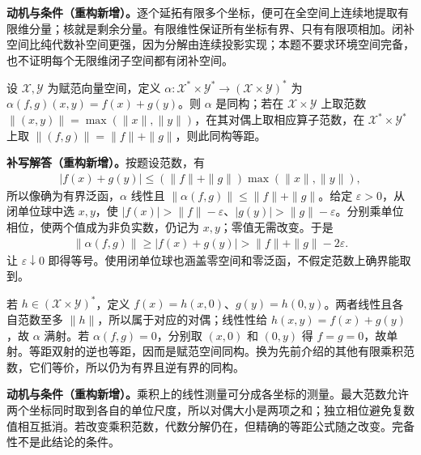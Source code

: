 \documentclass[../../main.tex]{subfiles}
\begin{document}
\begin{remark}
\textbf{动机与条件（重构新增）。}逐个延拓有限多个坐标，便可在全空间上连续地提取有限维分量；核就是剩余分量。有限维性保证所有坐标有界、只有有限项相加。闭补空间比纯代数补空间更强，因为分解由连续投影实现；本题不要求环境空间完备，也不证明每个无限维闭子空间都有闭补空间。
\end{remark}
\begin{exercise}\label{exercise:ch05-dual-product}
设 $\mathcal X,\mathcal Y$ 为赋范向量空间，定义 $\alpha:\mathcal X^*\times\mathcal Y^*\to(\mathcal X\times\mathcal Y)^*$ 为 $\alpha(f,g)(x,y)=f(x)+g(y)$。则 $\alpha$ 是同构；若在 $\mathcal X\times\mathcal Y$ 上取范数 $\|(x,y)\|=\max(\|x\|,\|y\|)$，在其对偶上取相应算子范数，在 $\mathcal X^*\times\mathcal Y^*$ 上取 $\|(f,g)\|=\|f\|+\|g\|$，则此同构等距。
\end{exercise}
\begin{solution}
\textbf{补写解答（重构新增）。}按题设范数，有
\begin{align*}
|f(x)+g(y)|\le(\|f\|+\|g\|)\max(\|x\|,\|y\|),
\end{align*}
所以像确为有界泛函，$\alpha$ 线性且 $\|\alpha(f,g)\|\le\|f\|+\|g\|$。给定 $\varepsilon>0$，从闭单位球中选 $x,y$，使 $|f(x)|>\|f\|-\varepsilon$、$|g(y)|>\|g\|-\varepsilon$。分别乘单位相位，使两个值成为非负实数，仍记为 $x,y$；零值无需改变。于是
\begin{align*}
\|\alpha(f,g)\|\ge|f(x)+g(y)|>\|f\|+\|g\|-2\varepsilon.
\end{align*}
让 $\varepsilon\downarrow0$ 即得等号。使用闭单位球也涵盖零空间和零泛函，不假定范数上确界能取到。

若 $h\in(\mathcal X\times\mathcal Y)^*$，定义 $f(x)=h(x,0)$、$g(y)=h(0,y)$。两者线性且各自范数至多 $\|h\|$，所以属于对应的对偶；线性性给 $h(x,y)=f(x)+g(y)$，故 $\alpha$ 满射。若 $\alpha(f,g)=0$，分别取 $(x,0)$ 和 $(0,y)$ 得 $f=g=0$，故单射。等距双射的逆也等距，因而是赋范空间同构。换为先前介绍的其他有限乘积范数，它们等价，所以仍为有界且逆有界的同构。
\end{solution}
\begin{remark}
\textbf{动机与条件（重构新增）。}乘积上的线性测量可分成各坐标的测量。最大范数允许两个坐标同时取到各自的单位尺度，所以对偶大小是两项之和；独立相位避免复数值相互抵消。若改变乘积范数，代数分解仍在，但精确的等距公式随之改变。完备性不是此结论的条件。
\end{remark}
\end{document}

